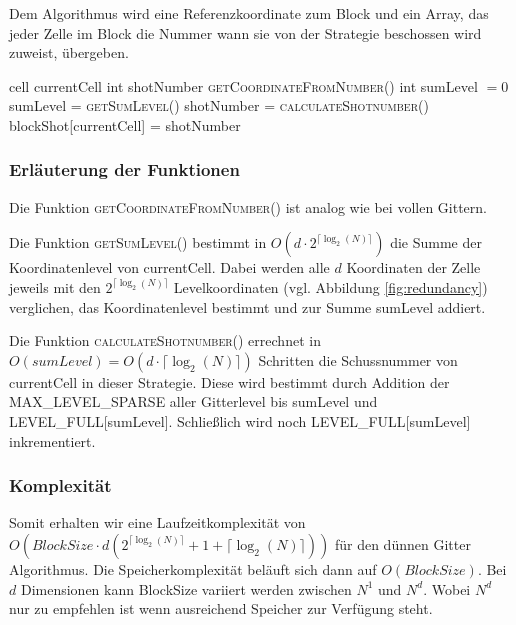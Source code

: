 \documentclass[a4paper,12pt]{llncs}
\numberwithin{equation}{section}
\begin{document}
Dem Algorithmus wird eine Referenzkoordinate zum Block und ein Array, das jeder Zelle im Block die Nummer wann sie von der Strategie beschossen wird zuweist, übergeben.

\begin{tcolorbox}
	\begin{algorithmic}
		\State cell currentCell
		\State int shotNumber
		\State \textsc{getCoordinateFromNumber}()
		\State int sumLevel $=0$
		\State sumLevel = \textsc{getSumLevel}()
		\State shotNumber = \textsc{calculateShotnumber}()
		\State blockShot[currentCell] = shotNumber
		\EndFor
		\EndFunction
	\end{algorithmic}
\end{tcolorbox}

\subsubsection{Erläuterung der Funktionen}
Die Funktion \textsc{getCoordinateFromNumber}() ist analog wie bei vollen Gittern.

Die Funktion \textsc{getSumLevel}() bestimmt in $O\left(d\cdot 2^{\lceil\log_2(N)\rceil}\right)$ die Summe der Koordinatenlevel von currentCell. Dabei werden alle $d$ Koordinaten der Zelle jeweils mit den $2^{\lceil\log_2(N)\rceil}$ Levelkoordinaten (vgl. Abbildung \ref{fig:redundancy}) verglichen, das Koordinatenlevel bestimmt und zur Summe sumLevel addiert.

Die Funktion \textsc{calculateShotnumber}() errechnet in $O(sumLevel) = O\left(d\cdot \lceil\log_2(N)\rceil\right)$ Schritten die Schussnummer von currentCell in dieser Strategie. Diese wird bestimmt durch Addition der MAX\_LEVEL\_SPARSE aller Gitterlevel bis sumLevel und LEVEL\_FULL[sumLevel]. Schließlich wird noch LEVEL\_FULL[sumLevel] inkrementiert.

\subsubsection{Komplexität}
Somit erhalten wir eine Laufzeitkomplexität von \\ $O\left(BlockSize\cdot d\left( 2^{\lceil\log_2(N)\rceil}+1+\lceil\log_2(N)\rceil\right)\right)$ für den dünnen Gitter Algorithmus. Die Speicherkomplexität beläuft sich dann auf $O(BlockSize)$. Bei $d$ Dimensionen kann BlockSize variiert werden zwischen $N^1$ und $N^d$. Wobei $N^d$ nur zu empfehlen ist wenn ausreichend Speicher zur Verfügung steht. 
\end{document}
